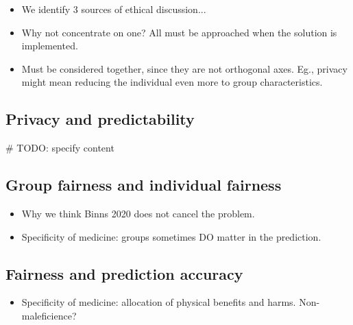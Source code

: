 \begin{itemize}
    \item We identify 3 sources of ethical discussion...
    \item Why not concentrate on one? All must be approached when the solution is implemented.
    \item Must be considered together, since they are not orthogonal axes. Eg., privacy might mean reducing the individual even more to group characteristics.
\end{itemize}

\subsection{Privacy and predictability}
\# TODO: specify content

\subsection{Group fairness and individual fairness}
\begin{itemize}
    \item Why we think Binns 2020 does not cancel the problem.
    \item Specificity of medicine: groups sometimes DO matter in the prediction.
\end{itemize}

\subsection{Fairness and prediction accuracy}
\begin{itemize}
    \item Specificity of medicine: allocation of physical benefits and harms. Non-maleficience?
\end{itemize}
